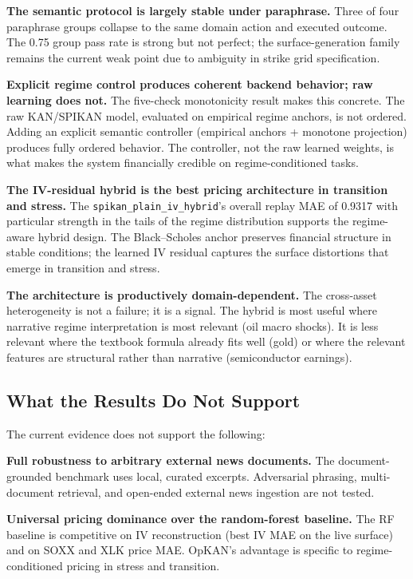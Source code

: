 \documentclass[11pt,a4paper]{article}
\begin{document}
\textbf{The semantic protocol is largely stable under paraphrase.} Three of four paraphrase groups collapse to the same domain action and executed outcome. The 0.75 group pass rate is strong but not perfect; the surface-generation family remains the current weak point due to ambiguity in strike grid specification.

\textbf{Explicit regime control produces coherent backend behavior; raw learning does not.} The five-check monotonicity result makes this concrete. The raw KAN/SPIKAN model, evaluated on empirical regime anchors, is not ordered. Adding an explicit semantic controller (empirical anchors + monotone projection) produces fully ordered behavior. The controller, not the raw learned weights, is what makes the system financially credible on regime-conditioned tasks.

\textbf{The IV-residual hybrid is the best pricing architecture in transition and stress.} The \texttt{spikan\_plain\_iv\_hybrid}'s overall replay MAE of 0.9317 with particular strength in the tails of the regime distribution supports the regime-aware hybrid design. The Black--Scholes anchor preserves financial structure in stable conditions; the learned IV residual captures the surface distortions that emerge in transition and stress.

\textbf{The architecture is productively domain-dependent.} The cross-asset heterogeneity is not a failure; it is a signal. The hybrid is most useful where narrative regime interpretation is most relevant (oil macro shocks). It is less relevant where the textbook formula already fits well (gold) or where the relevant features are structural rather than narrative (semiconductor earnings).

\subsection{What the Results Do Not Support}

The current evidence does not support the following:

\textbf{Full robustness to arbitrary external news documents.} The document-grounded benchmark uses local, curated excerpts. Adversarial phrasing, multi-document retrieval, and open-ended external news ingestion are not tested.

\textbf{Universal pricing dominance over the random-forest baseline.} The RF baseline is competitive on IV reconstruction (best IV MAE on the live surface) and on SOXX and XLK price MAE. OpKAN's advantage is specific to regime-conditioned pricing in stress and transition.
\end{document}
